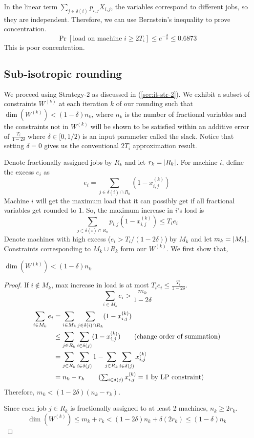 In the linear term $\sum_{j \in \delta(i)} p_{i,j}X_{i,j}$,
the variables correspond to different jobs, so they are independent.
Therefore, we can use Bernstein's inequality to prove concentration.
\[ \Pr[\textrm{load on machine } i \ge 2T_i]
\le e^{-\frac{3}{8}} \le 0.6873 \]
This is poor concentration.

\subsection{Sub-isotropic rounding}

We proceed using Strategy-2 as discussed in (\ref{sec:it-str-2}).
We exhibit a subset of constraints $W^{(k)}$ at each iteration $k$ of our rounding such that
$\dim(W^{(k)}) < (1-\delta)n_k$, where $n_k$ is the number of fractional variables
and the constraints not in $W^{(k)}$ will be shown to be satisfied
within an additive error of $\frac{T_i}{1-2\delta}$ where $\delta \in [0,1/2)$
is an input parameter called the slack.
Notice that setting $\delta = 0$ gives us the conventional $2T_i$ approximation result.

Denote fractionally assigned jobs by $R_k$ and let $r_k = \left\lvert R_k \right\rvert$.
For machine $i$, define the excess $e_i$ as
\[ e_i = \sum_{j \in \delta(i) \cap R_k} (1 - x_{i,j}^{(k)}) \]
Machine $i$ will get the maximum load that it can possibly get if
all fractional variables get rounded to 1. So, the maximum increase in $i$'s load is
\[ \sum_{j \in \delta(i) \cap R_k} p_{i,j} (1-x_{i,j}^{(k)}) \leq T_i e_i \]
Denote machines with high excess ($e_i > T_i/(1-2\delta)$) by $M_k$ and let $m_k = \left\lvert M_k \right\rvert$.
Constraints corresponding to $M_k \cup R_k$ form our $W^{(k)}$. We first show that,
\begin{lemma}
$\dim(W^{(k)}) < (1-\delta)n_k$
\end{lemma}
\begin{proof}
If $i \not\in M_k$, max increase in load is at most $T_i e_i \le \frac{T_i}{1-2\delta}$.
\[ \sum_{i \in M_k} e_i > \frac{m_k}{1-2\delta} \]
\begin{align*}
\sum_{i \in M_k} e_i
&= \sum_{i \in M_k} \sum_{j \in \delta(i) \cap R_k} (1 - x_{i,j}^{(k)})
\\ &\leq \sum_{j \in R_k} \sum_{i \in \delta(j)} (1 - x_{i,j}^{(k)})  \tag{change order of summation}
\\ &= \sum_{j \in R_k} \sum_{i \in \delta(j)} 1 - \sum_{j \in R_k} \sum_{i \in \delta(j)} x_{i,j}^{(k)}
\\ &= n_k - r_k \tag{$\sum_{i \in \delta(j)} x_{i,j}^{(k)} = 1$ by LP constraint}
\end{align*}
Therefore, $m_k < (1-2\delta)(n_k - r_k)$.

Since each job $j \in R_k$ is fractionally assigned to at least 2 machines, $n_k \geq 2r_k$.
\[ \dim(W^{(k)}) \le m_k + r_k < (1-2\delta)n_k + \delta(2r_k) \le (1-\delta)n_k \]
\end{proof}

